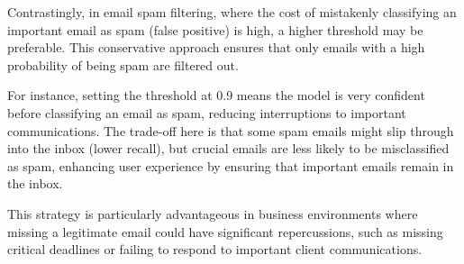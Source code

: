 \documentclass{article}
\theoremstyle{definition}
\theoremstyle{theorem}
\theoremstyle{theorem}
\theoremstyle{theorem}
\theoremstyle{theorem}
\theoremstyle{definition}
\theoremstyle{definition}
\theoremstyle{definition}
\theoremstyle{definition}
\theoremstyle{definition}
\begin{document}
Contrastingly, in email spam filtering, where the cost of mistakenly classifying an important email as spam (false positive) is high, a higher threshold may be preferable. This conservative approach ensures that only emails with a high probability of being spam are filtered out. 

For instance, setting the threshold at 0.9 means the model is very confident before classifying an email as spam, reducing interruptions to important communications. The trade-off here is that some spam emails might slip through into the inbox (lower recall), but crucial emails are less likely to be misclassified as spam, enhancing user experience by ensuring that important emails remain in the inbox.

This strategy is particularly advantageous in business environments where missing a legitimate email could have significant repercussions, such as missing critical deadlines or failing to respond to important client communications.
\end{document}
